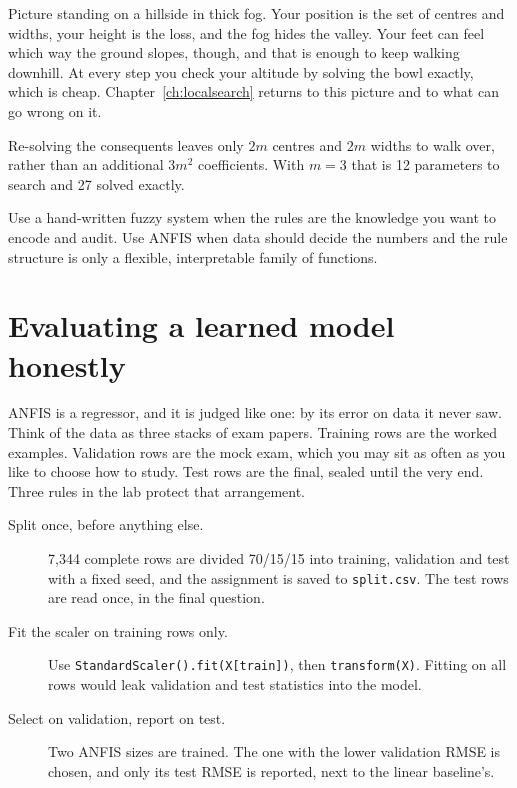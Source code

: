 \begin{analogy}
Picture standing on a hillside in thick fog. Your position is the set of centres and widths, your height is the loss, and the fog hides the valley. Your feet can feel which way the ground slopes, though, and that is enough to keep walking downhill. At every step you check your altitude by solving the bowl exactly, which is cheap. Chapter~\ref{ch:localsearch} returns to this picture and to what can go wrong on it.
\end{analogy}

Re-solving the consequents leaves only $2m$ centres and $2m$ widths to walk over, rather than an additional $3m^2$ coefficients. With $m=3$ that is 12 parameters to search and 27 solved exactly.

\begin{keyidea}
Use a hand-written fuzzy system when the rules are the knowledge you want to encode and audit. Use ANFIS when data should decide the numbers and the rule structure is only a flexible, interpretable family of functions.
\end{keyidea}

\section{Evaluating a learned model honestly}

ANFIS is a regressor, and it is judged like one: by its error on data it never saw. Think of the data as three stacks of exam papers. Training rows are the worked examples. Validation rows are the mock exam, which you may sit as often as you like to choose how to study. Test rows are the final, sealed until the very end. Three rules in the lab protect that arrangement.

\begin{description}
  \item[Split once, before anything else.] 7,344 complete rows are divided 70/15/15 into training, validation and test with a fixed seed, and the assignment is saved to \texttt{split.csv}. The test rows are read once, in the final question.
  \item[Fit the scaler on training rows only.] Use \texttt{StandardScaler().fit(X[train])}, then \texttt{transform(X)}. Fitting on all rows would leak validation and test statistics into the model.
  \item[Select on validation, report on test.] Two ANFIS sizes are trained. The one with the lower validation RMSE is chosen, and only its test RMSE is reported, next to the linear baseline's.
\end{description}

